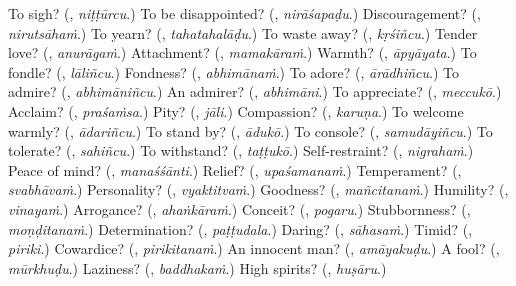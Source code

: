 \begin{tcolorbox}[breakable,colback=teal!4,colframe=teal!35!black,title={Before you move on}]
To sigh? (\textbf{}, \emph{niṭṭūrcu}.) To be disappointed? (\textbf{}, \emph{nirāśapaḍu}.) Discouragement? (\textbf{}, \emph{nirutsāhaṁ}.) To yearn? (\textbf{}, \emph{tahatahalāḍu}.) To waste away? (\textbf{}, \emph{kṛśiñcu}.) Tender love? (\textbf{}, \emph{anurāgaṁ}.) Attachment? (\textbf{}, \emph{mamakāraṁ}.) Warmth? (\textbf{}, \emph{āpyāyata}.) To fondle? (\textbf{}, \emph{lāliñcu}.) Fondness? (\textbf{}, \emph{abhimānaṁ}.) To adore? (\textbf{}, \emph{ārādhiñcu}.) To admire? (\textbf{}, \emph{abhimāniñcu}.) An admirer? (\textbf{}, \emph{abhimāni}.) To appreciate? (\textbf{}, \emph{meccukō}.) Acclaim? (\textbf{}, \emph{praśaṁsa}.) Pity? (\textbf{}, \emph{jāli}.) Compassion? (\textbf{}, \emph{karuṇa}.) To welcome warmly? (\textbf{}, \emph{ādariñcu}.) To stand by? (\textbf{}, \emph{ādukō}.) To console? (\textbf{}, \emph{samudāyiñcu}.) To tolerate? (\textbf{}, \emph{sahiñcu}.) To withstand? (\textbf{}, \emph{taṭṭukō}.) Self-restraint? (\textbf{}, \emph{nigrahaṁ}.) Peace of mind? (\textbf{}, \emph{manaśśānti}.) Relief? (\textbf{}, \emph{upaśamanaṁ}.) Temperament? (\textbf{}, \emph{svabhāvaṁ}.) Personality? (\textbf{}, \emph{vyaktitvaṁ}.) Goodness? (\textbf{}, \emph{mañcitanaṁ}.) Humility? (\textbf{}, \emph{vinayaṁ}.) Arrogance? (\textbf{}, \emph{ahaṅkāraṁ}.) Conceit? (\textbf{}, \emph{pogaru}.) Stubbornness? (\textbf{}, \emph{moṇḍitanaṁ}.) Determination? (\textbf{}, \emph{paṭṭudala}.) Daring? (\textbf{}, \emph{sāhasaṁ}.) Timid? (\textbf{}, \emph{piriki}.) Cowardice? (\textbf{}, \emph{pirikitanaṁ}.) An innocent man? (\textbf{}, \emph{amāyakuḍu}.) A fool? (\textbf{}, \emph{mūrkhuḍu}.) Laziness? (\textbf{}, \emph{baddhakaṁ}.) High spirits? (\textbf{}, \emph{huṣāru}.)
\end{tcolorbox}
